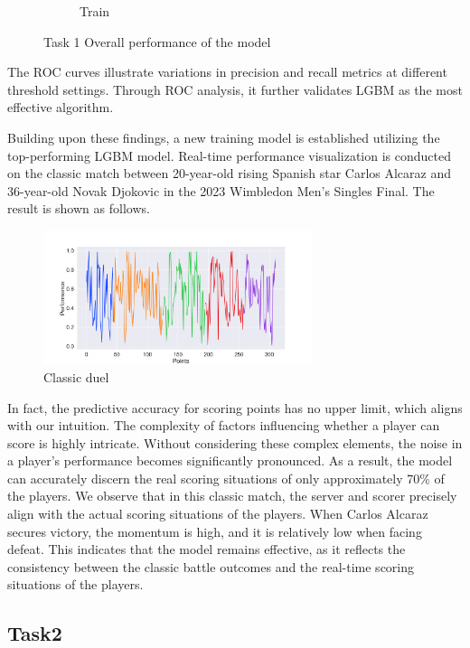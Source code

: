 \documentclass{article}
\begin{document}
\begin{figure}[H]
\begin{subfigure}{0.48\textwidth}
          \caption{Train}
          \label{fig:roctrain}
      \end{subfigure}
      \caption{Task 1 Overall performance of the model}
      \label{fig:overall}
\end{figure}

The ROC curves illustrate variations in precision and recall metrics at different threshold settings. Through ROC analysis, it further validates LGBM as the most effective algorithm.

Building upon these findings, a new training model is established utilizing the top-performing LGBM model. Real-time performance visualization is conducted on the classic match between 20-year-old rising Spanish star Carlos Alcaraz and 36-year-old Novak Djokovic in the 2023 Wimbledon Men's Singles Final. The result is shown as follows.
\begin{figure}[H]
      \centering
      \includegraphics[width=0.7\textwidth]{classic_duel_trend.png}
      \caption{Classic duel}
\end{figure}

In fact, the predictive accuracy for scoring points has no upper limit, which aligns with our intuition. The complexity of factors influencing whether a player can score is highly intricate.
Without considering these complex elements, the noise in a player's performance becomes significantly pronounced. As a result, the model can accurately discern the real scoring situations of only approximately 70\%
of the players. We observe that in this classic match, the server and scorer precisely align with the actual scoring situations of the players. When Carlos Alcaraz secures victory, the momentum is high, and it is relatively low when facing defeat.
This indicates that the model remains effective, as it reflects the consistency between the classic battle outcomes and the real-time scoring situations of the players.
\subsection{Task2}
\end{document}
